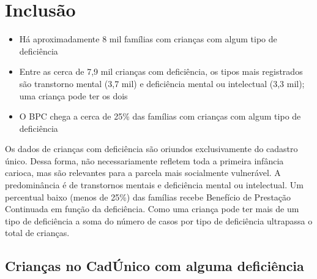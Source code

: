 
\chapter{Inclusão}\label{cap:eixo-2}

\begin{achados}\begin{itemize}

\item Há aproximadamente 8 mil famílias com crianças com algum tipo de deficiência

\item Entre as cerca de 7,9 mil crianças com deficiência, os tipos mais registrados são transtorno mental (3,7 mil) e deficiência mental ou intelectual (3,3 mil); uma criança pode ter os dois

\item O BPC chega a cerca de 25\% das famílias com crianças com algum tipo de deficiência

\end{itemize}\end{achados}

Os dados de crianças com deficiência são oriundos exclusivamente do cadastro único. Dessa forma, não necessariamente refletem toda a primeira infância carioca, mas são relevantes para a parcela mais socialmente vulnerável. A predominância é de transtornos mentais e deficiência mental ou intelectual. Um percentual baixo (menos de 25\%) das famílias recebe Benefício de Prestação Continuada em função da deficiência. Como uma criança pode ter mais de um tipo de deficiência a soma do número de casos por tipo de deficiência ultrapassa o total de crianças.

\section{Crianças no CadÚnico com alguma deficiência}

